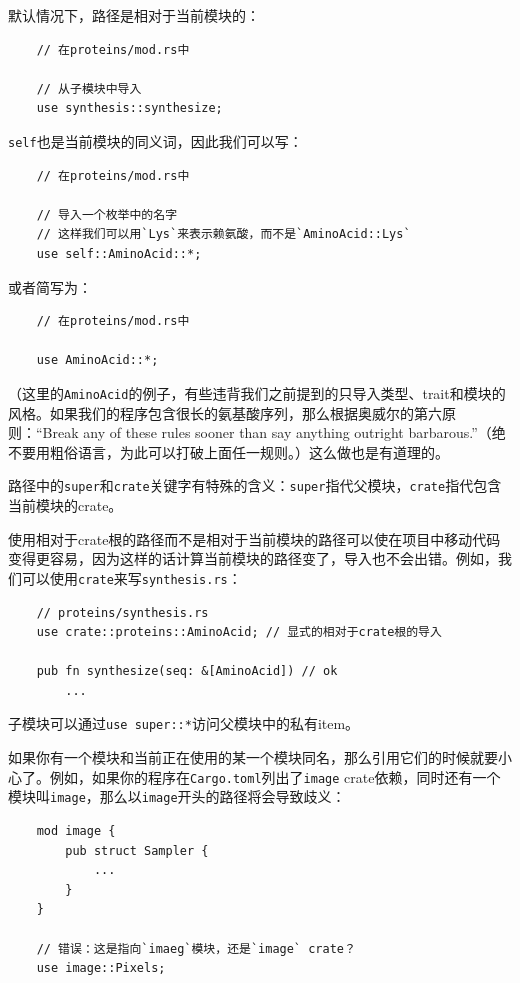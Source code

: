 默认情况下，路径是相对于当前模块的：
\begin{verbatim}
    // 在proteins/mod.rs中

    // 从子模块中导入
    use synthesis::synthesize;
\end{verbatim}

\texttt{self}也是当前模块的同义词，因此我们可以写：
\begin{verbatim}
    // 在proteins/mod.rs中

    // 导入一个枚举中的名字
    // 这样我们可以用`Lys`来表示赖氨酸，而不是`AminoAcid::Lys`
    use self::AminoAcid::*;
\end{verbatim}

或者简写为：
\begin{verbatim}
    // 在proteins/mod.rs中

    use AminoAcid::*;
\end{verbatim}

（这里的\texttt{AminoAcid}的例子，有些违背我们之前提到的只导入类型、trait和模块的风格。如果我们的程序包含很长的氨基酸序列，那么根据奥威尔的第六原则：“Break any of these rules sooner than say anything outright barbarous.”（绝不要用粗俗语言，为此可以打破上面任一规则。）这么做也是有道理的。

路径中的\texttt{super}和\texttt{crate}关键字有特殊的含义：\texttt{super}指代父模块，\texttt{crate}指代包含当前模块的crate。

使用相对于crate根的路径而不是相对于当前模块的路径可以使在项目中移动代码变得更容易，因为这样的话计算当前模块的路径变了，导入也不会出错。例如，我们可以使用\texttt{crate}来写\texttt{synthesis.rs}：
\begin{verbatim}
    // proteins/synthesis.rs
    use crate::proteins::AminoAcid; // 显式的相对于crate根的导入

    pub fn synthesize(seq: &[AminoAcid]) // ok
        ...
\end{verbatim}

子模块可以通过\texttt{use super::*}访问父模块中的私有item。

如果你有一个模块和当前正在使用的某一个模块同名，那么引用它们的时候就要小心了。例如，如果你的程序在\texttt{Cargo.toml}列出了\texttt{image} crate依赖，同时还有一个模块叫\texttt{image}，那么以\texttt{image}开头的路径将会导致歧义：
\begin{verbatim}
    mod image {
        pub struct Sampler {
            ...
        }
    }

    // 错误：这是指向`imaeg`模块，还是`image` crate？
    use image::Pixels;
\end{verbatim}

